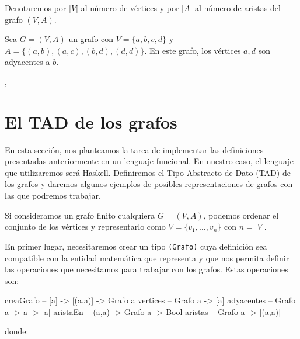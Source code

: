 \begin{nota}
  Denotaremos por $|V|$ al número de vértices y por $|A|$ al número de aristas
  del grafo $(V,A)$.
\end{nota}

\begin{ejemplo}
  Sea $G = (V,A)$ un grafo con $V = \{a,b,c,d\}$ y
  $A = \{\allowbreak(a,b), \allowbreak (a,c), \allowbreak (b,d), \allowbreak (d,d)\}$.
  En este grafo, los vértices $a,d$ son adyacentes a $b$.

  \begin{center},
  \end{center}
\end{ejemplo}

\section{El TAD de los grafos}

\label{sec:TAD_grafos}

En esta sección, nos planteamos la tarea de implementar las definiciones
presentadas anteriormente en un lenguaje funcional. En nuestro caso, el
lenguaje que utilizaremos será Haskell. Definiremos el Tipo Abstracto de Dato
(TAD) de los grafos y daremos algunos ejemplos de posibles representaciones de
grafos con las que podremos trabajar.

Si consideramos un grafo finito cualquiera $G = (V,A)$, podemos ordenar el
conjunto de los vértices y representarlo como $V = \{v_1, \dots, v_n\}$ con
$n = |V|$.

En primer lugar, necesitaremos crear un tipo \texttt{(Grafo)} cuya definición sea compatible
con la entidad matemática que representa y que nos permita definir las operaciones que 
necesitamos para trabajar con los grafos. Estas operaciones son:

\begin{code}
creaGrafo  -- [a] -> [(a,a)] -> Grafo a
vertices   -- Grafo a -> [a]
adyacentes -- Grafo a -> a -> [a]
aristaEn   -- (a,a) -> Grafo a -> Bool
aristas    -- Grafo a -> [(a,a)]
\end{code}
donde:

